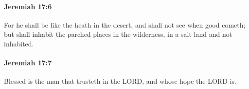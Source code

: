 		\paragraph{Jeremiah 17:6} %
			\label{JEREMIAH-17-6}

			For he shall be like the heath in the desert, and shall not see when good cometh; but shall inhabit the parched places in the wilderness, in a salt land and not inhabited.


		\paragraph{Jeremiah 17:7} %
			\label{JEREMIAH-17-7}

			Blessed is the man that trusteth in the LORD, and whose hope the LORD is.


